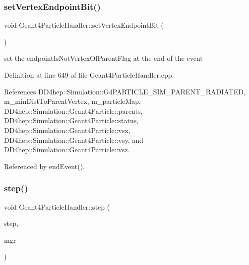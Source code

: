 \subsubsection{\texorpdfstring{set\+Vertex\+Endpoint\+Bit()}{setVertexEndpointBit()}}
{\footnotesize\ttfamily void Geant4\+Particle\+Handler\+::set\+Vertex\+Endpoint\+Bit (\begin{DoxyParamCaption}{ }\end{DoxyParamCaption})\hspace{0.3cm}{\ttfamily [protected]}}



set the endpoint\+Is\+Not\+Vertex\+Of\+Parent\+Flag at the end of the event 



Definition at line 649 of file Geant4\+Particle\+Handler.\+cpp.



References D\+D4hep\+::\+Simulation\+::\+G4\+P\+A\+R\+T\+I\+C\+L\+E\+\_\+\+S\+I\+M\+\_\+\+P\+A\+R\+E\+N\+T\+\_\+\+R\+A\+D\+I\+A\+T\+ED, m\+\_\+min\+Dist\+To\+Parent\+Vertex, m\+\_\+particle\+Map, D\+D4hep\+::\+Simulation\+::\+Geant4\+Particle\+::parents, D\+D4hep\+::\+Simulation\+::\+Geant4\+Particle\+::status, D\+D4hep\+::\+Simulation\+::\+Geant4\+Particle\+::vsx, D\+D4hep\+::\+Simulation\+::\+Geant4\+Particle\+::vsy, and D\+D4hep\+::\+Simulation\+::\+Geant4\+Particle\+::vsz.



Referenced by end\+Event().

\hypertarget{class_d_d4hep_1_1_simulation_1_1_geant4_particle_handler_abb534226cfb8d022077d48681226a179}{}\label{class_d_d4hep_1_1_simulation_1_1_geant4_particle_handler_abb534226cfb8d022077d48681226a179} 
\subsubsection{\texorpdfstring{step()}{step()}}
{\footnotesize\ttfamily void Geant4\+Particle\+Handler\+::step (\begin{DoxyParamCaption}\item[{const G4\+Step $\ast$}]{step,  }\item[{G4\+Stepping\+Manager $\ast$}]{mgr }\end{DoxyParamCaption})\hspace{0.3cm}{\ttfamily [virtual]}}



